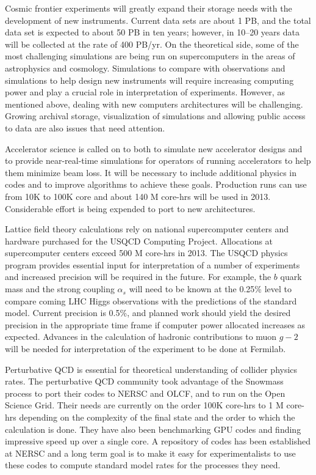 
Cosmic frontier experiments will greatly expand their storage needs with the
development of new instruments.  Current data sets are about 1 PB, and the
total data set is expected to about 50 PB in ten years; however, in
10--20 years data will be collected at the rate of 400 PB/yr.
On the theoretical side, some of the most challenging simulations are
being run on supercomputers in the areas of astrophysics and cosmology.
Simulations to compare with observations and simulations to help design
new instruments will require increasing computing power and play a crucial
role in interpretation of experiments.  However,
as mentioned above, dealing with new computers architectures
will be challenging.  Growing archival storage, visualization of
simulations and allowing public access
to data are also issues that need attention.

Accelerator science is called on to both to simulate new accelerator designs
and to provide near-real-time simulations for operators of running accelerators to 
help them minimize beam loss.
It will be necessary to include additional physics in codes and
to improve algorithms to achieve these goals.  
Production runs can use from 10K to 100K core and about 140 M core-hrs 
will be used in 2013.  Considerable effort is being expended to 
port to new architectures.

Lattice field theory calculations rely on national supercomputer
centers and hardware purchased for the USQCD Computing Project.
Allocations at supercomputer centers exceed 500 M core-hrs in 2013.
The USQCD physics program provides essential input for interpretation
of a number of experiments and increased precision will be
required in the future.  For example, the $b$ quark mass and the
strong coupling $\alpha_s$ will need to be known at the
0.25\% level to compare coming LHC Higgs observations with the
predictions of the standard model.  Current precision is 0.5\%, and
planned work should yield the desired precision in the
appropriate time frame if computer power allocated increases as expected.
Advances in the calculation of hadronic contributions to muon $g-2$ will
be needed for interpretation of the experiment to be done at Fermilab.

Perturbative QCD is essential for theoretical understanding of collider
physics rates.
The perturbative QCD community took advantage of the Snowmass process to
port their codes to NERSC and OLCF, and to run on the Open Science Grid.  
Their needs are currently on the order 100K core-hrs to 1 M core-hrs
depending on the complexity of the final state and the order to
which the calculation is done.  They have also been benchmarking
GPU codes and finding impressive speed up over a single core.  A repository
of codes has been established at NERSC and a long term goal is to
make it easy for experimentalists to use these codes to compute
standard model rates for the processes they need.

